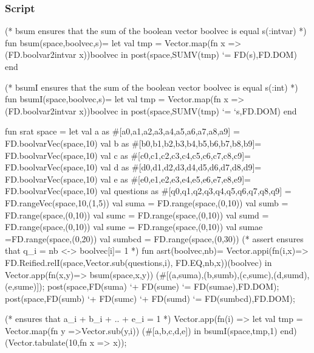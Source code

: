 \documentclass[a4paper,halfparskip]{scrartcl}
\begin{document}
\subsubsection{Script}
\begin{myverbatim}
(* bsum ensures that the sum of the boolean vector 
   boolvec is equal s(:intvar) *)
fun bsum(space,boolvec,s)=
    let
        val tmp = Vector.map(fn x => 
                      (FD.boolvar2intvar x))boolvec
    in
       post(space,SUMV(tmp) `= FD(s),FD.DOM)
    end
                                
(* bsumI ensures that the sum of the boolean vector 
   boolvec is equal s(:int) *)
fun bsumI(space,boolvec,s)= 
    let
        val tmp = Vector.map(fn x => 
                      (FD.boolvar2intvar x))boolvec
    in
       post(space,SUMV(tmp) `= `s,FD.DOM)
    end                         

fun srat space =
    let
        val a as #[a0,a1,a2,a3,a4,a5,a6,a7,a8,a9] = 
              FD.boolvarVec(space,10)
        val b as #[b0,b1,b2,b3,b4,b5,b6,b7,b8,b9]= 
              FD.boolvarVec(space,10)
        val c as #[c0,c1,c2,c3,c4,c5,c6,c7,c8,c9]= 
              FD.boolvarVec(space,10)
        val d as #[d0,d1,d2,d3,d4,d5,d6,d7,d8,d9]= 
              FD.boolvarVec(space,10)
        val e as #[e0,e1,e2,e3,e4,e5,e6,e7,e8,e9]= 
              FD.boolvarVec(space,10)   
        val questions as #[q0,q1,q2,q3,q4,q5,q6,q7,q8,q9] = 
              FD.rangeVec(space,10,(1,5))
        val suma = FD.range(space,(0,10))
        val sumb = FD.range(space,(0,10))
        val sumc = FD.range(space,(0,10))
        val sumd = FD.range(space,(0,10))
        val sume = FD.range(space,(0,10))
        val sumae =FD.range(space,(0,20))
        val sumbcd = FD.range(space,(0,30))
       (* assert ensures that q_i = nb <-> boolvec[i]= 1  *)
        fun asrt(boolvec,nb)= Vector.appi(fn(i,x)=> 
            FD.Reified.relI(space,Vector.sub(questions,i),
                                  FD.EQ,nb,x))(boolvec)
   in  
        Vector.app(fn(x,y)=> bsum(space,x,y))
             (#[(a,suma),(b,sumb),(c,sumc),(d,sumd),(e,sume)]);
        post(space,FD(suma) `+ FD(sume) `= FD(sumae),FD.DOM);
        post(space,FD(sumb) `+ FD(sumc) `+ FD(sumd) 
                    `= FD(sumbcd),FD.DOM);
            
       (* ensures that a_i + b_i + .. + e_i = 1 *)
        Vector.app(fn(i) => 
          let 
              val tmp = Vector.map(fn y =>Vector.sub(y,i))
                         (#[a,b,c,d,e])
          in
              bsumI(space,tmp,1)
          end)
              (Vector.tabulate(10,fn x => x)); 
                                   

\end{myverbatim}
\end{document}
